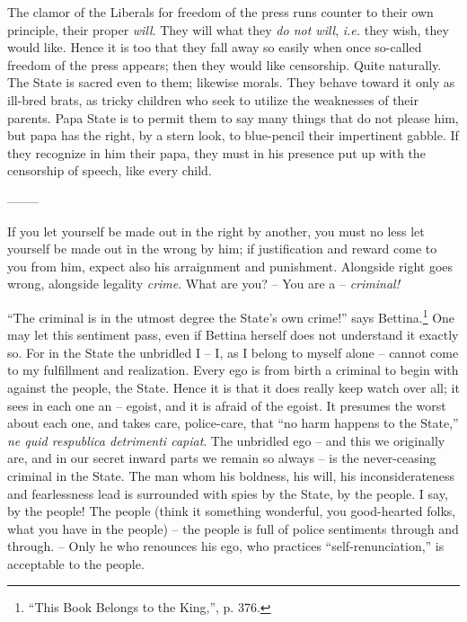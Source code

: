 The clamor of the Liberals for freedom of the press runs counter to their own 
principle, their proper \textit{will}. They will what they \textit{do not 
will}, \textit{i.e.} they wish, they would like. Hence it is too that they 
fall away so easily when once so-called freedom of the press appears; then 
they would like censorship. Quite naturally. The State is sacred even to them; 
likewise morals. They behave toward it only as ill-bred brats, as tricky 
children who seek to utilize the weaknesses of their parents. Papa State is to 
permit them to say many things that do not please him, but papa has the right, 
by a stern look, to blue-pencil their impertinent gabble. If they recognize in 
him their papa, they must in his presence put up with the censorship of 
speech, like every child.

\begin{center}
--------\end{center}


If you let yourself be made out in the right by another, you must no less let 
yourself be made out in the wrong by him; if justification and reward come to 
you from him, expect also his arraignment and punishment. Alongside right goes 
wrong, alongside legality \textit{crime}. What are you? -- You are a -- 
\textit{criminal!}

``The criminal is in the utmost degree the State's own crime!'' says 
Bettina.\footnote{``This Book Belongs to the King,'', p. 376.} One may let 
this sentiment pass, even if Bettina herself does not understand it exactly 
so. For in the State the unbridled I -- I, as I belong to myself alone -- 
cannot come to my fulfillment and realization. Every ego is from birth a 
criminal to begin with against the people, the State. Hence it is that it does 
really keep watch over all; it sees in each one an -- egoist, and it is afraid 
of the egoist. It presumes the worst about each one, and takes care, 
police-care, that ``no harm happens to the State,'' \textit{ne quid 
respublica detrimenti capiat}. The unbridled ego -- and this we originally 
are, and in our secret inward parts we remain so always -- is the 
never-ceasing criminal in the State. The man whom his boldness, his will, his 
inconsiderateness and fearlessness lead is surrounded with spies by the State, 
by the people. I say, by the people! The people (think it something wonderful, 
you good-hearted folks, what you have in the people) -- the people is full of 
police sentiments through and through. -- Only he who renounces his ego, who 
practices ``self-renunciation,'' is acceptable to the people.

